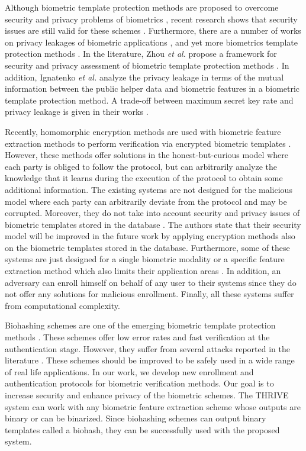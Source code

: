 \documentclass[journal]{IEEEtran}
\begin{document}
Although biometric template protection methods are proposed to overcome security and privacy problems of biometrics \cite{Jain2, Cimato1, Matsumoto, Putte, Bringer, Barni, Nkumar, Feng, Bui, Juels, Karabat, Bai, Kuan, Rathgeb, Lumini}, recent research shows that security issues are still valid for these schemes \cite{Scheirer, Adler, Boult, Kong, Vielhauer, Cheung, Kummel}. Furthermore, there are a number of works on privacy leakages of biometric applications \cite {Simoens, Ignatenko1},  and yet more biometrics template protection methods \cite{Zhou, Zhou2, Simoens2}. In the literature, Zhou \textit{et al.} propose a framework for security and privacy assessment of biometric template protection methods \cite{Zhou}. In addition, Ignatenko \textit{et al.} analyze the privacy leakage in terms of the mutual information between the public helper data and biometric features in a biometric template protection method. A trade-off between maximum secret key rate and privacy leakage is given in their works \cite{Ignatenko1, Ignatenko2}. 

Recently, homomorphic encryption methods are used with biometric feature extraction methods to perform verification via encrypted biometric templates \cite{Erkin, Sadeghi, Barni, Barni2}. However, these methods offer solutions in the honest-but-curious model where each party is obliged to follow the protocol, but can arbitrarily analyze the knowledge that it learns during the execution of the protocol to obtain some additional information. The existing systems are not designed for the malicious model where each party can arbitrarily deviate from the protocol and may be corrupted. Moreover, they do not take into account security and privacy issues of biometric templates stored in the database \cite{Barni, Barni2}. The authors state that their security model will be improved in the future work by applying encryption methods also on the biometric templates stored in the database. Furthermore, some of these systems are just designed for a single biometric modality or a specific feature extraction method which also limits their application areas \cite{Erkin, Sadeghi}. In addition, an adversary can enroll himself on behalf of any user to their systems since they do not offer any solutions for malicious enrollment. Finally, all these systems suffer from computational complexity.

Biohashing schemes are one of the emerging biometric template protection methods \cite{Karabat, Bai, Kuan, Rathgeb, Lumini}. These schemes offer low error rates and fast verification at the authentication stage. However, they suffer from several attacks reported in the literature \cite{Kong, Vielhauer, Cheung, Kummel}. These schemes should be improved  to be safely used in a wide range of real life applications. In our work, we develop new enrollment and authentication protocols for biometric verification methods. Our goal is to increase security and enhance privacy of the biometric schemes. The THRIVE system can work with any biometric feature extraction scheme whose outputs are binary or can be binarized. Since biohashing schemes can output binary templates called a biohash, they can be successfully used with the proposed system. 
\end{document}
